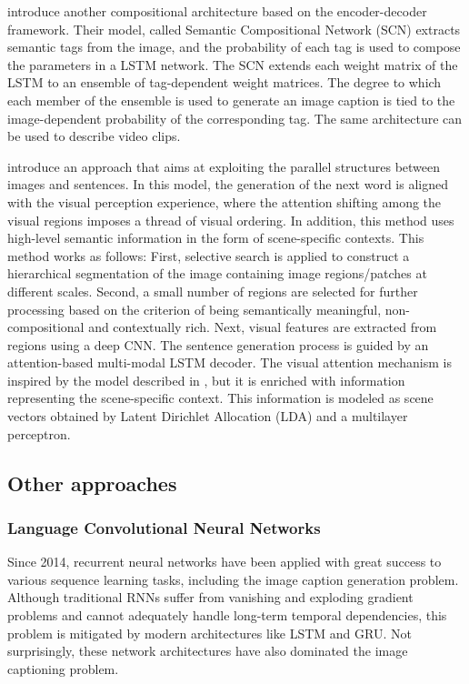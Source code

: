 \citet{Gan2017_SCN} introduce another compositional architecture based on the encoder-decoder framework. Their model, called Semantic Compositional Network (SCN) extracts semantic tags from the image, and the probability of each tag is used to compose the parameters in a LSTM network. The SCN extends each weight matrix of the LSTM to an ensemble of tag-dependent weight matrices. The degree to which each member of the ensemble is used to generate an image caption is tied to the image-dependent probability of the corresponding tag. The same architecture can be used to describe video clips.

\citet{Fu2017} introduce an approach that aims at exploiting the parallel structures between images and sentences. In this model, the generation of the next word is aligned with the visual perception experience, where the attention shifting among the visual regions imposes a thread of visual ordering. In addition, this method uses high-level semantic information in the form of scene-specific contexts. This method works as follows: First, selective search \citep{Uijlings2013} is applied to construct a hierarchical segmentation of the image containing image regions/patches at different scales. Second, a small number of regions are selected for further processing based on the criterion of being semantically meaningful, non-compositional and contextually rich. Next, visual features are extracted from regions using a deep CNN. The sentence generation process is guided by an attention-based multi-modal LSTM decoder. The visual attention mechanism is inspired by the model described in \citep{Xu2015}, but it is enriched with information representing the scene-specific context. This information is modeled as scene vectors obtained by Latent Dirichlet Allocation (LDA) \citep{Blei2003} and a multilayer perceptron.

\subsection{Other approaches}

\subsubsection{Language Convolutional Neural Networks}

Since 2014, recurrent neural networks have been applied with great success to various sequence learning tasks, including the image caption generation problem. Although traditional RNNs suffer from vanishing and exploding gradient problems and cannot adequately handle long-term temporal dependencies, this problem is mitigated by modern architectures like LSTM \cite{Hochreiter1997} and GRU\citep{Chung2014}. Not surprisingly, these network architectures have also dominated the image captioning problem. 

